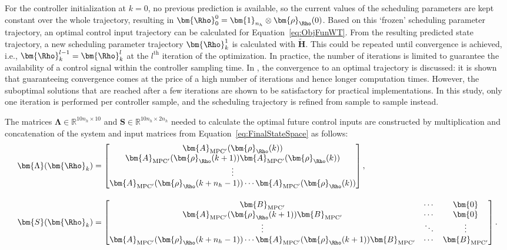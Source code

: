 For the controller initialization at $k = 0$, no previous prediction is available, so the current values of the scheduling parameters are kept constant over the whole trajectory, resulting in $\bm{\Rho}_0^0 = \bm{1}_{n_h} \otimes \bm{\rho}_{\Rho}(0)$. Based on this `frozen' scheduling parameter trajectory, an optimal control input trajectory can be calculated for Equation~\eqref{eq:ObjFunWT}. From the resulting predicted state trajectory, a new scheduling parameter trajectory $\bm{\Rho}_k^{1}$ is calculated with $\tilde{\bm{H}}$. This could be repeated until convergence is achieved, i.e., $\bm{\Rho}_k^{l-1} = \bm{\Rho}_k^l$ at the $l^\text{th}$ iteration of the optimization. In practice, the number of iterations is limited to guarantee the availability of a control signal within the controller sampling time. In \cite{hespe2021convergence}, the convergence to an optimal trajectory is discussed: it is shown that guaranteeing convergence comes at the price of a high number of iterations and hence longer computation times. However, the suboptimal solutions that are reached after a few iterations are shown to be satisfactory for practical implementations. In this study, only one iteration is performed per controller sample, and the scheduling trajectory is refined from sample to sample instead.

The matrices \( \bm{\Lambda} \in \mathbb{R}^{10n_h \times 10}\) and \( \bm{S} \in \mathbb{R}^{10n_h \times 2n_h} \) needed to calculate the optimal future control inputs are constructed by multiplication and concatenation of the system and input matrices from Equation~\eqref{eq:FinalStateSpace} as follows:
\begin{equation} \label{eq:nearlyToeplitzMat}
    \begin{aligned}
        \bm{\Lambda}(\bm{\Rho}_k) &= \begin{bmatrix}
            \bm{A}_{\text{MPC}^\prime}(\bm{\rho}_{\Rho}(k)) \\
            \bm{A}_{\text{MPC}^\prime}(\bm{\rho}_{\Rho}(k+1)) \bm{A}_{\text{MPC}^\prime}(\bm{\rho}_{\Rho}(k)) \\
            \vdots\\
            \bm{A}_{\text{MPC}^\prime}(\bm{\rho}_{\Rho}(k+n_h-1)) \cdots \bm{A}_{\text{MPC}^\prime}(\bm{\rho}_{\Rho}(k))
        \end{bmatrix}, \\[10pt]
        \bm{S}(\bm{\Rho}_k) &=
        \begin{bmatrix}
            \bm{B}_{\text{MPC}^\prime} & \cdots & \bm{0} \\
            \bm{A}_{\text{MPC}^\prime}(\bm{\rho}_{\Rho}(k+1)) \bm{B}_{\text{MPC}^\prime} & \cdots & \bm{0} \\
            \vdots & \ddots & \vdots \\
            \bm{A}_{\text{MPC}^\prime}(\bm{\rho}_{\Rho}(k+n_h-1)) \cdots \bm{A}_{\text{MPC}^\prime}(\bm{\rho}_{\Rho}(k+1)) \bm{B}_{\text{MPC}^\prime} & \cdots & \bm{B}_{\text{MPC}^\prime}
        \end{bmatrix}.
    \end{aligned}
\end{equation}

